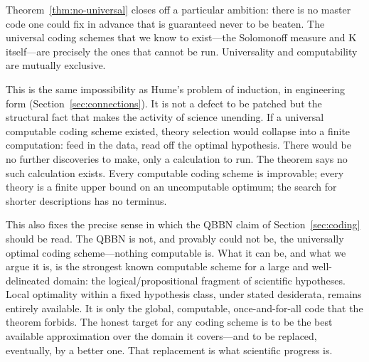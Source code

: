 Theorem~\ref{thm:no-universal} closes off a particular ambition: there is no master code one could fix in advance that is guaranteed never to be beaten. The universal coding schemes that we know to exist---the Solomonoff measure and $\mathrm{K}$ itself---are precisely the ones that cannot be run. Universality and computability are mutually exclusive.

This is the same impossibility as Hume's problem of induction, in engineering form (Section~\ref{sec:connections}). It is not a defect to be patched but the structural fact that makes the activity of science unending. If a universal computable coding scheme existed, theory selection would collapse into a finite computation: feed in the data, read off the optimal hypothesis. There would be no further discoveries to make, only a calculation to run. The theorem says no such calculation exists. Every computable coding scheme is improvable; every theory is a finite upper bound on an uncomputable optimum; the search for shorter descriptions has no terminus.

This also fixes the precise sense in which the QBBN claim of Section~\ref{sec:coding} should be read. The QBBN is not, and provably could not be, the universally optimal coding scheme---nothing computable is. What it can be, and what we argue it is, is the strongest known computable scheme for a large and well-delineated domain: the logical/propositional fragment of scientific hypotheses. Local optimality within a fixed hypothesis class, under stated desiderata, remains entirely available. It is only the global, computable, once-and-for-all code that the theorem forbids. The honest target for any coding scheme is to be the best available approximation over the domain it covers---and to be replaced, eventually, by a better one. That replacement is what scientific progress is.